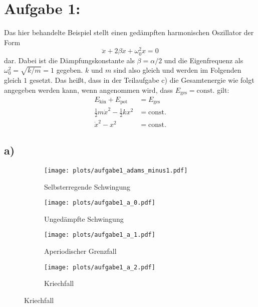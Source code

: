 \newpage
\section{Aufgabe 1: }
\label{sec:auf1}
  Das hier behandelte Beispiel stellt einen gedämpften harmonischen Oszillator der Form
  \begin{equation}
      \ddot{x} + 2 \beta \dot{x} + \omega_0^2 x = 0
  \end{equation}
  dar.
  Dabei ist die Dämpfungskonstante als $\beta = \alpha / 2$ und die Eigenfrequenz als $\omega_0^2 = \sqrt{k/m} = 1$ gegeben.
  $k$ und $m$ sind also gleich und werden im Folgenden gleich $1$ gesetzt.
  Das heißt, dass in der Teilaufgabe c) die Gesamtenergie wie folgt angegeben werden kann, wenn angenommen wird, dass $E_{\mathrm{ges}} = \mathrm{const.}$ gilt:
  \begin{align}
      E_{\mathrm{kin}} + E_{\mathrm{pot}} &= E_{\mathrm{ges}} \\[3pt]
      \frac{1}{2} m \dot{x}^2 - \frac{1}{2} k x^2 &= \mathrm{const.} \\
      \dot{x}^2 - x^2 &= \mathrm{const.}
      \label{eqn:gesamtenergie}
  \end{align}

\subsection*{a)}
  \begin{figure}[ht]
    \centering
    \begin{subfigure}{0.49\textwidth}
      \texttt{[image: plots/aufgabe1\_adams\_minus1.pdf]} \vspace*{-0.7cm}
      \caption{Selbsterregende Schwingung}
      \label{fig:aufgabe1_adams_minus1}
    \end{subfigure}
    \hfill
    \begin{subfigure}{0.49\textwidth}
      \texttt{[image: plots/aufgabe1\_a\_0.pdf]} \vspace*{-0.7cm}
      \caption{Ungedämpfte Schwingung}
      \label{fig:aufgabe1_a_0}
    \end{subfigure}
    \begin{subfigure}{0.49\textwidth}
      \texttt{[image: plots/aufgabe1\_a\_1.pdf]} \vspace*{-0.7cm}
      \caption{Aperiodischer Grenzfall}
      \label{fig:aufgabe1_a_1}
    \end{subfigure}
    \hfill
    \begin{subfigure}{0.49\textwidth}
      \texttt{[image: plots/aufgabe1\_a\_2.pdf]} \vspace*{-0.7cm}
      \caption{Kriechfall}
      \label{fig:aufgabe1_a_2}
    \end{subfigure}
    
    \label{fig:aufgabe1_a}    

  \end{figure}
\FloatBarrier

